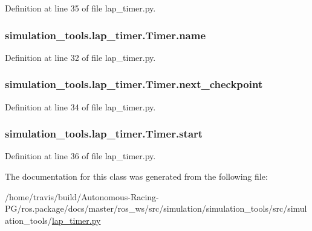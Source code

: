 Definition at line 35 of file lap\+\_\+timer.\+py.

\subsubsection[{\texorpdfstring{name}{name}}]{\setlength{\rightskip}{0pt plus 5cm}simulation\+\_\+tools.\+lap\+\_\+timer.\+Timer.\+name}\hypertarget{classsimulation__tools_1_1lap__timer_1_1_timer_a9bf911e55976cb1d04b10440cea407c1}{}\label{classsimulation__tools_1_1lap__timer_1_1_timer_a9bf911e55976cb1d04b10440cea407c1}


Definition at line 32 of file lap\+\_\+timer.\+py.

\subsubsection[{\texorpdfstring{next\+\_\+checkpoint}{next_checkpoint}}]{\setlength{\rightskip}{0pt plus 5cm}simulation\+\_\+tools.\+lap\+\_\+timer.\+Timer.\+next\+\_\+checkpoint}\hypertarget{classsimulation__tools_1_1lap__timer_1_1_timer_a74b19b620b1f59ce1d558524c275f4c3}{}\label{classsimulation__tools_1_1lap__timer_1_1_timer_a74b19b620b1f59ce1d558524c275f4c3}


Definition at line 34 of file lap\+\_\+timer.\+py.

\subsubsection[{\texorpdfstring{start}{start}}]{\setlength{\rightskip}{0pt plus 5cm}simulation\+\_\+tools.\+lap\+\_\+timer.\+Timer.\+start}\hypertarget{classsimulation__tools_1_1lap__timer_1_1_timer_afc51d0e4a6aa0e19be5c8622352b9afe}{}\label{classsimulation__tools_1_1lap__timer_1_1_timer_afc51d0e4a6aa0e19be5c8622352b9afe}


Definition at line 36 of file lap\+\_\+timer.\+py.



The documentation for this class was generated from the following file\+:\begin{DoxyCompactItemize}
\item 
/home/travis/build/\+Autonomous-\/\+Racing-\/\+P\+G/ros.\+package/docs/master/ros\+\_\+ws/src/simulation/simulation\+\_\+tools/src/simulation\+\_\+tools/\hyperlink{lap__timer_8py}{lap\+\_\+timer.\+py}\end{DoxyCompactItemize}
